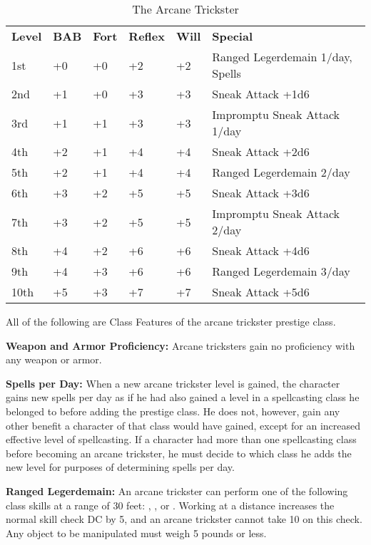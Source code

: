 \begin{table}[htb]
\caption{The Arcane Trickster}
\centering
\begin{tabular}{*{6}{l}}
\textbf{Level} & \textbf{BAB} & \textbf{Fort} & \textbf{Reflex} & \textbf{Will} & \textbf{Special} \\
1st & +0 & +0 & +2 & +2 & Ranged Legerdemain 1/day, Spells \\
2nd & +1 & +0 & +3 & +3 & Sneak Attack +1d6 \\
3rd & +1 & +1 & +3 & +3 & Impromptu Sneak Attack 1/day\\
4th & +2 & +1 & +4 & +4 & Sneak Attack +2d6 \\
5th & +2 & +1 & +4 & +4 & Ranged Legerdemain 2/day \\
6th & +3 & +2 & +5 & +5 & Sneak Attack +3d6 \\
7th & +3 & +2 & +5 & +5 & Impromptu Sneak Attack 2/day\\
8th & +4 & +2 & +6 & +6 & Sneak Attack +4d6 \\
9th & +4 & +3 & +6 & +6 & Ranged Legerdemain 3/day \\
10th & +5 & +3 & +7 & +7 & Sneak Attack +5d6 \\
\end{tabular}
\end{table}

\ClassFeatures

All of the following are Class Features of the arcane trickster prestige class.

\textbf{Weapon and Armor Proficiency:} Arcane tricksters gain no proficiency with 
any weapon or armor.

\textbf{Spells per Day:} When a new arcane trickster level is gained, the character 
gains new spells per day as if he had also gained a level in a spellcasting class 
he belonged to before adding the prestige class. He does not, however, gain any 
other benefit a character of that class would have gained, except for an increased 
effective level of spellcasting. If a character had more than one spellcasting 
class before becoming an arcane trickster, he must decide to which class he adds 
the new level for purposes of determining spells per day.

\textbf{Ranged Legerdemain:} An arcane trickster can perform one of the following 
class skills at a range of 30 feet: , , or . 
Working at a distance increases the normal skill check DC by 5, and an arcane trickster 
cannot take 10 on this check. Any object to be manipulated must weigh 5 pounds 
or less.

